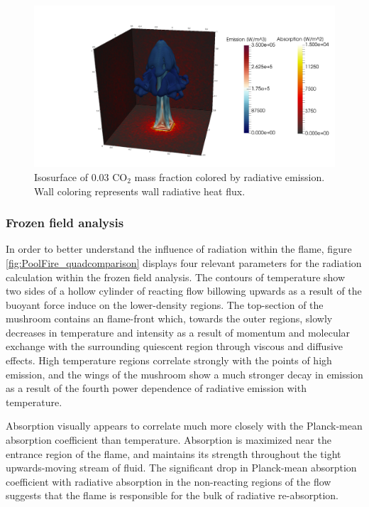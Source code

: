 \begin{figure}
\includegraphics[width=\linewidth]{figures/ch4/radiation_contours.png}
\caption{Isosurface of 0.03 CO$_2$ mass fraction colored by radiative emission. Wall coloring represents wall radiative heat flux.}
\label{fig:PoolFire_radiationcontours}
\end{figure}

\subsubsection{Frozen field analysis}

In order to better understand the influence of radiation within the flame, figure \ref{fig:PoolFire_quadcomparison} displays four relevant parameters for the radiation calculation within the frozen field analysis. 
The contours of temperature show two sides of a hollow cylinder of reacting flow billowing upwards as a result of the buoyant force induce on the lower-density regions.
The top-section of the mushroom contains an  flame-front which, towards the outer regions, slowly decreases in temperature and intensity as a result of momentum and molecular exchange with the surrounding quiescent region through viscous and diffusive effects.
High temperature regions correlate strongly with the points of high emission, and the wings of the mushroom show a much stronger decay in emission as a result of the fourth power dependence of radiative emission with temperature.

Absorption visually appears to correlate much more closely with the Planck-mean absorption coefficient than temperature. Absorption is maximized near the entrance region of the flame, and maintains its strength throughout the tight upwards-moving stream of fluid.
The significant drop in Planck-mean absorption coefficient with radiative absorption in the non-reacting regions of the flow suggests that the flame is responsible for the bulk of radiative re-absorption. 

